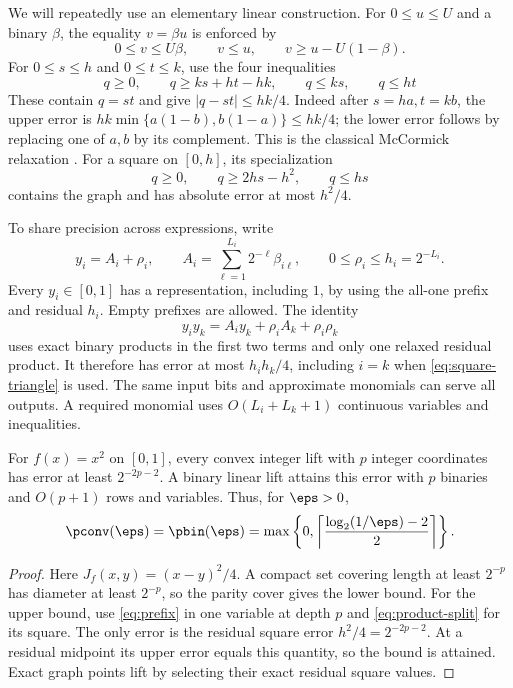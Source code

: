 We will repeatedly use an elementary linear construction. For
$0\le u\le U$ and a binary $\beta$, the equality $v=\beta u$ is enforced by
\begin{equation}\label{eq:binary-product}
 0\le v\le U\beta,\qquad v\le u,\qquad
 v\ge u-U(1-\beta).
\end{equation}
For $0\le s\le h$ and $0\le t\le k$, use the four inequalities
\begin{equation}\label{eq:mccormick}
 q\ge0,\qquad q\ge ks+ht-hk,\qquad q\le ks,\qquad q\le ht
\end{equation}
These contain $q=st$ and give $|q-st|\le hk/4$.
Indeed after $s=ha,t=kb$, the upper error is
$hk\min\{a(1-b),b(1-a)\}\le hk/4$; the lower error follows by
replacing one of $a,b$ by its complement. This is the classical
McCormick relaxation \citep{mccormick1976}.
For a square on $[0,h]$, its specialization
\begin{equation}\label{eq:square-triangle}
 q\ge0,\qquad q\ge2hs-h^2,\qquad q\le hs
\end{equation}
contains the graph and has absolute error at most $h^2/4$.

To share precision across expressions, write
\begin{equation}\label{eq:prefix}
 y_i=A_i+\rho_i,\qquad
 A_i=\sum_{\ell=1}^{L_i}2^{-\ell}\beta_{i\ell},\qquad
 0\le\rho_i\le h_i=2^{-L_i}.
\end{equation}
Every $y_i\in[0,1]$ has a representation, including $1$, by using the
all-one prefix and residual $h_i$. Empty prefixes are allowed.
The identity
\begin{equation}\label{eq:product-split}
 y_i y_k=A_i y_k+\rho_i A_k+\rho_i\rho_k
\end{equation}
uses exact binary products in the first two terms and only one relaxed
residual product. It therefore has error at most $h_i h_k/4$, including
$i=k$ when \eqref{eq:square-triangle} is used. The same input bits and
approximate monomials can serve all outputs. A required monomial uses
$O(L_i+L_k+1)$ continuous variables and inequalities.

\begin{theorem}\label{thm:square}
For $f(x)=x^2$ on $[0,1]$, every convex integer lift with $p$ integer
coordinates has error at least $2^{-2p-2}$. A binary linear lift attains
this error with $p$ binaries and $O(p+1)$ rows and variables. Thus, for
$\eps>0$,
\[
 \pconv(\eps)=\pbin(\eps)
 =\max\left\{0,\left\lceil\frac{\log_2(1/\eps)-2}{2}\right\rceil\right\}.
\]
\end{theorem}
\begin{proof}
Here $J_f(x,y)=(x-y)^2/4$. A compact set covering length at least
$2^{-p}$ has diameter at least $2^{-p}$, so the parity cover gives the
lower bound. For the upper bound, use \eqref{eq:prefix} in one variable
at depth $p$ and \eqref{eq:product-split} for its square. The only error
is the residual square error $h^2/4=2^{-2p-2}$. At a residual midpoint
its upper error equals this quantity, so the bound is attained. Exact
graph points lift by selecting their exact residual square values.
\end{proof}

